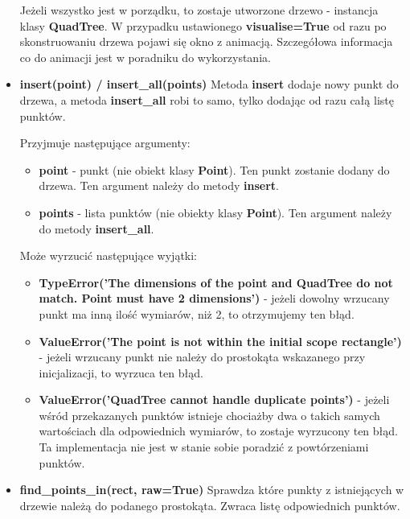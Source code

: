 \documentclass[a4paper, 12pt]{article}
\begin{document}
\begin{itemize}
        \noindent
        \quad Jeżeli wszystko jest w porządku, to zostaje utworzone drzewo - instancja klasy \textbf{QuadTree}. W przypadku ustawionego \textbf{visualise=True} od razu po skonstruowaniu drzewa pojawi się okno z animacją. Szczegółowa informacja co do animacji jest w poradniku do wykorzystania.
        \vspace{6pt}
        
        \item \textbf{insert(point) / insert\_all(points)} \vspace{6pt}\newline
        \quad Metoda \textbf{insert} dodaje nowy punkt do drzewa, a metoda \textbf{insert\_all} robi to samo, tylko dodając od razu całą listę punktów.
        
        \noindent
        \quad Przyjmuje następujące argumenty:
        \begin{itemize}
            \item \textbf{point} - punkt (nie obiekt klasy \textbf{Point}). Ten punkt zostanie dodany do drzewa. Ten argument należy do metody \textbf{insert}.
            \item \textbf{points} - lista punktów (nie obiekty klasy \textbf{Point}). Ten argument należy do metody \textbf{insert\_all}.
        \end{itemize}
        
        \noindent
        \quad Może wyrzucić następujące wyjątki:
        \begin{itemize}
            \item \textbf{TypeError('The dimensions of the point and QuadTree do not match. Point must have 2 dimensions')} - jeżeli dowolny wrzucany punkt ma inną ilość wymiarów, niż 2, to otrzymujemy ten błąd.
            \item \textbf{ValueError('The point is not within the initial scope rectangle')} - jeżeli wrzucany punkt nie należy do prostokąta wskazanego przy inicjalizacji, to wyrzuca ten błąd.
            \item \textbf{ValueError('QuadTree cannot handle duplicate points')} - jeżeli wśród przekazanych punktów istnieje chociażby dwa o takich samych wartościach dla odpowiednich wymiarów, to zostaje wyrzucony ten błąd. Ta implementacja nie jest w stanie sobie poradzić z powtórzeniami punktów.
        \end{itemize}
        \vspace{6pt}
        
        \item \textbf{find\_points\_in(rect, raw=True)} \vspace{6pt}\newline
        \quad Sprawdza które punkty z istniejących w drzewie należą do podanego prostokąta. Zwraca listę odpowiednich punktów.
        

\end{itemize}
\end{document}
